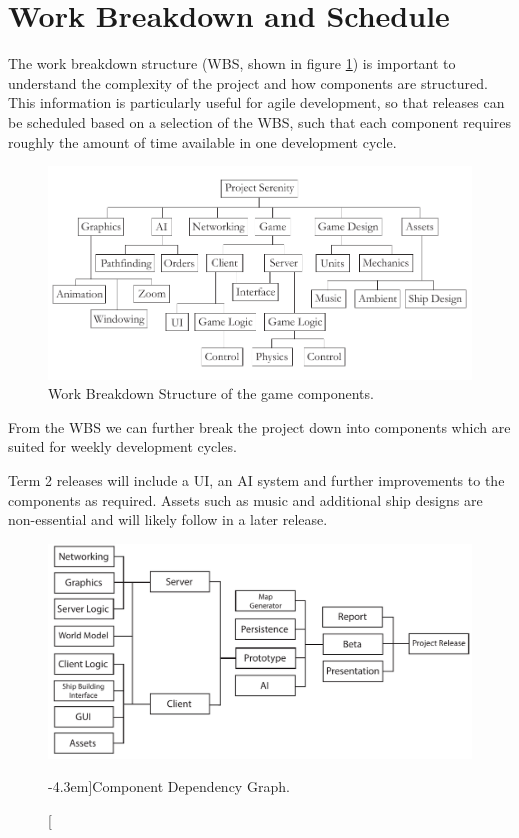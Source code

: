 \section{Work Breakdown and Schedule}
The work breakdown structure (WBS, shown in figure \ref{wbs}) is important to understand the complexity of the project and how components are structured. This information is particularly useful for agile development, so that releases can be scheduled based on a selection of the WBS,
 such that each component requires roughly the amount of time available in one development cycle.

\begin{figure}[h!]
	\label{wbs}
	\includegraphics{res/wbs}
	\caption{Work Breakdown Structure of the game components.}
\end{figure}

From the WBS we can further break the project down into components which are suited for weekly development cycles.

Term 2 releases will include a UI, an AI system and further improvements to the components as required. Assets such as music and additional ship designs are non-essential and will likely follow in a later release.

\begin{figure}
	\label{dependency_tree}
	\includegraphics{res/dependency_tree}
	\caption[][-4.3em]{Component Dependency Graph.}
\end{figure}

